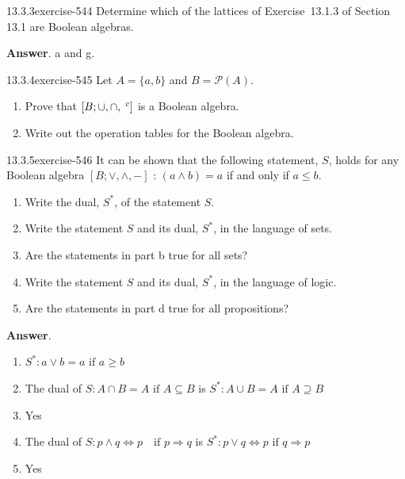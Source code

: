 \documentclass[twoside,10pt,]{book}
\numberwithin{equation}{section}
\begin{document}
\begin{divisionsolution}{13.3.3}{}{exercise-544}%
\hypertarget{p-4880}{}%
Determine which of the lattices of Exercise~13.1.3 of Section 13.1 are Boolean algebras.%
\par\smallskip%
\noindent\textbf{Answer}.\quad%
\hypertarget{p-4881}{}%
a and g.%
\end{divisionsolution}%
\begin{divisionsolution}{13.3.4}{}{exercise-545}%
\hypertarget{p-4882}{}%
Let \(A = \{a, b\}\) and \(B = \mathcal{P}(A)\).\leavevmode%
\begin{enumerate}[label=(\alph*)]
\item\hypertarget{li-2218}{}\hypertarget{p-4883}{}%
Prove that \([B; \cup, \cap, \hspace{1 mm}^c ]\) is a Boolean algebra.%
\item\hypertarget{li-2219}{}\hypertarget{p-4884}{}%
Write out the operation tables for the Boolean algebra.%
\end{enumerate}
%
\end{divisionsolution}%
\begin{divisionsolution}{13.3.5}{}{exercise-546}%
\hypertarget{p-4885}{}%
It can be shown that the following statement, \(S\), holds for any Boolean algebra \([B; \lor , \land, -]\) : \((a \land  b) = a\) if and only if \(a \leq  b\).\leavevmode%
\begin{enumerate}[label=(\alph*)]
\item\hypertarget{li-2220}{}\hypertarget{p-4886}{}%
Write the dual, \(S^*\), of the statement \(S\).%
\item\hypertarget{li-2221}{}\hypertarget{p-4887}{}%
Write the statement \(S\) and its dual, \(S^*\), in the language of sets.%
\item\hypertarget{li-2222}{}\hypertarget{p-4888}{}%
Are the statements in part b true for all sets?%
\item\hypertarget{li-2223}{}\hypertarget{p-4889}{}%
Write the statement \(S\) and its dual, \(S^*\), in the language of logic.%
\item\hypertarget{li-2224}{}\hypertarget{p-4890}{}%
Are the statements in part d true for all propositions?%
\end{enumerate}
%
\par\smallskip%
\noindent\textbf{Answer}.\quad%
\hypertarget{p-4891}{}%
\leavevmode%
\begin{enumerate}[label=(\alph*)]
\item\hypertarget{li-2225}{}\hypertarget{p-4892}{}%
\(S^*:a \lor  b= a \textrm{ if } a \geq  b\)%
\item\hypertarget{li-2226}{}\hypertarget{p-4893}{}%
The dual of  \(S:A\cap B = A\textrm{ if }A \subseteq B\) is \(S^*:A \cup B = A\textrm{ if } A \supseteq B\)%
\item\hypertarget{li-2227}{}\hypertarget{p-4894}{}%
Yes%
\item\hypertarget{li-2228}{}\hypertarget{p-4895}{}%
The dual of \(S:p \land q\Leftrightarrow p\textrm{    }\textrm{ if } p\Rightarrow q\) is \(S^*:p \lor q\Leftrightarrow p \textrm{ if } q\Rightarrow p\)%
\item\hypertarget{li-2229}{}\hypertarget{p-4896}{}%
Yes%
\end{enumerate}
%
\end{divisionsolution}%
\end{document}
